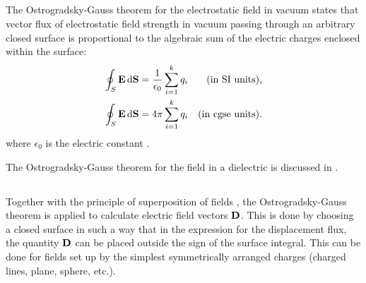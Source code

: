 \subsection{}\label{15.3.4} The Ostrogradsky-Gauss theorem for the electrostatic field in vacuum states that vector flux of electrostatic field strength in vacuum passing through an arbitrary closed surface is proportional to the algebraic sum of the electric charges enclosed within the surface:
\begin{align*}%
\oint_{S} \vb{E} \, \dd \vb{S} & = \frac{1}{\epsilon_{0}} \sum_{i=1}^{k} q_{i} & \text{(in SI units),}\\
\oint_{S} \vb{E} \, \dd \vb{S} & = 4 \pi \sum_{i=1}^{k} q_{i}& \text{(in cgse units)}.
\end{align*}
where $\epsilon_{0}$ is the electric constant .

The Ostrogradsky-Gauss theorem for the field in a dielectric is discussed in .

\subsection{}\label{5.3.5} Together with the principle of superposition of fields , the Ostrogradsky-Gauss theorem is applied to calculate electric field vectors $\vb{D}$. This is done by choosing a closed surface in such a way that in the expression for the displacement flux, the quantity $\vb{D}$ can be placed outside the sign of the surface integral. This can be done for fields set up by the simplest symmetrically arranged charges (charged lines, plane, sphere, etc.).
